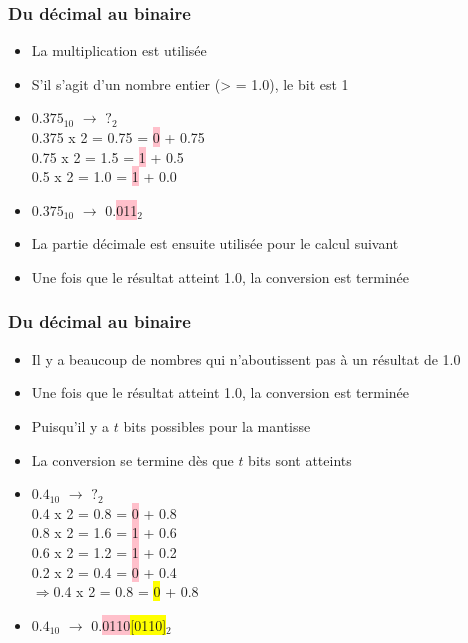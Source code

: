 \documentclass{beamer}
\begin{document}
\begin{frame}
\frametitle{Du décimal au binaire}
\begin{minipage}[b]{0.5\linewidth}
	\begin{itemize}
		\item La multiplication est utilisée
		\item S'il s'agit d'un nombre entier (> = 1.0), le bit est 1
		\item $0.375_{10}$ $\rightarrow$ $?_2$\\
	
	  0.375 x 2 = 0.75 = \colorbox{pink}{0} + 0.75\\
	  0.75 x 2 = 1.5  = \colorbox{pink}{1} + 0.5\\
	  0.5 x 2 = 1.0 = \colorbox{pink}{1} + 0.0\\
	  
	\item $0.375_{10}$ $\rightarrow$ 0.\colorbox{pink}{011}$_2$
	\end{itemize}
\end{minipage}
\begin{minipage}[b]{0.45\linewidth}
	\begin{itemize}
		\item La partie décimale est ensuite utilisée pour le calcul suivant
		\item Une fois que le résultat atteint 1.0, la conversion est terminée
	\end{itemize}
\end{minipage}
\end{frame}

\begin{frame}
\frametitle{Du décimal au binaire}

\begin{minipage}[b]{0.98\linewidth}
	\begin{itemize}
	\item  Il y a beaucoup de nombres qui n'aboutissent pas à un résultat de 1.0
	\item Une fois que le résultat atteint 1.0, la conversion est terminée
	\item Puisqu'il y a $t$ bits possibles pour la mantisse
	\item La conversion se termine dès que $t$ bits sont atteints
	
	\item $0.4_{10}$ $\rightarrow$ $?_2$\\
	
	  0.4 x 2 = 0.8 = \colorbox{pink}{0} + 0.8\\
	  0.8 x 2 = 1.6  = \colorbox{pink}{1} + 0.6\\
	  0.6 x 2 = 1.2 = \colorbox{pink}{1} + 0.2\\
	  0.2 x 2 = 0.4 = \colorbox{pink}{0} + 0.4\\
	  $\Rightarrow$0.4 x 2 = 0.8 = \colorbox{yellow}{0} + 0.8\\
	  
	\item $0.4_{10}$ $\rightarrow$ 0.\colorbox{pink}{0110}\colorbox{yellow}{[0110]}$_2$
	\end{itemize}
\end{minipage}
\end{frame}
\end{document}
